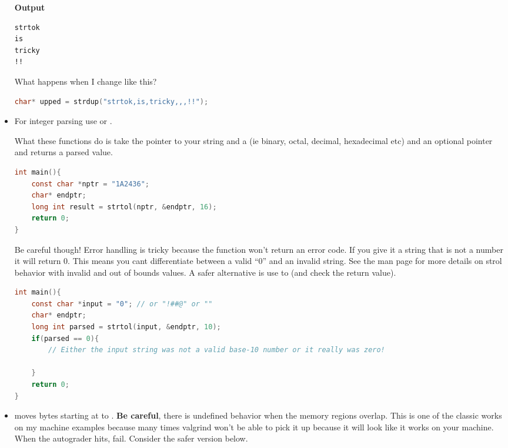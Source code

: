 \begin{itemize}
\textbf{Output}

\begin{lstlisting}[language=console]
strtok
is
tricky
!!
\end{lstlisting}

What happens when I change  like this?

\begin{lstlisting}[language=C]
char* upped = strdup("strtok,is,tricky,,,!!");
\end{lstlisting}

\item For integer parsing use
or
.

What these functions do is take the pointer to your string
 and a  (ie binary, octal, decimal,
hexadecimal etc) and an optional pointer  and returns a
parsed value.

\begin{lstlisting}[language=C]
int main(){
    const char *nptr = "1A2436";
    char* endptr;
    long int result = strtol(nptr, &endptr, 16);
    return 0;
}
\end{lstlisting}

Be careful though! Error handling is tricky because the function won't return an error code. If you give it a string that is not a number it will return 0. This means you cant differentiate between a valid ``0'' and an invalid string. See the man page for more details on strol behavior with invalid and out of bounds values. A safer alternative is use to  (and check the return value).

\begin{lstlisting}[language=C]
int main(){
    const char *input = "0"; // or "!##@" or ""
    char* endptr;
    long int parsed = strtol(input, &endptr, 10);
    if(parsed == 0){
        // Either the input string was not a valid base-10 number or it really was zero!

    }
    return 0;
}
\end{lstlisting}

\item {} moves  bytes starting at  to . \textbf{Be careful}, there is undefined behavior when the memory regions overlap. This is one of the classic works on my machine examples because many times valgrind won't be able to pick it up because it will look like it works on your machine. When the autograder hits, fail. Consider the safer version below.


\end{itemize}
